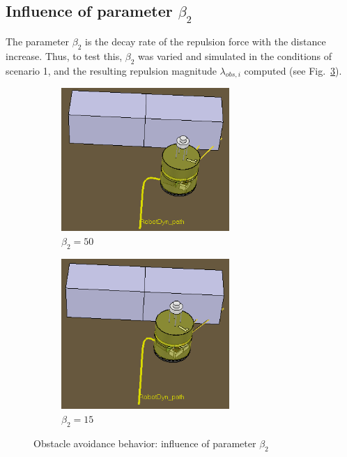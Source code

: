 \subsection{Influence of parameter $\beta_2$}%
\label{sec:infl-param-beta2}
The parameter $\beta_2$ is the decay rate of the repulsion force with the
distance increase. Thus, to test this, $\beta_2$ was varied and simulated in the
conditions of scenario 1, and the resulting repulsion magnitude
$\lambda_{obs,i}$ computed (see Fig.~\ref{fig:obs-2-5}). 
%
\begin{figure}[!hbt]
\centering
\begin{subfigure}{.5\textwidth}
  \centering
  \includegraphics[width=0.7\textwidth]{./img/obs-2-5-beta2-50.png}%
  \caption{$\beta_2 = 50$}%
\label{fig:obs-2-5-beta-2-50}
\end{subfigure}%
\begin{subfigure}{.5\textwidth}
  \centering
  \includegraphics[width=0.7\textwidth]{./img/obs-2-5-beta2-15.png}%
  \caption{$\beta_2 = 15$}%
\label{fig:obs-2-5-beta2-15}
\end{subfigure}
  \caption{Obstacle avoidance behavior: influence of parameter $\beta_2$}%
\label{fig:obs-2-5}
\end{figure}

